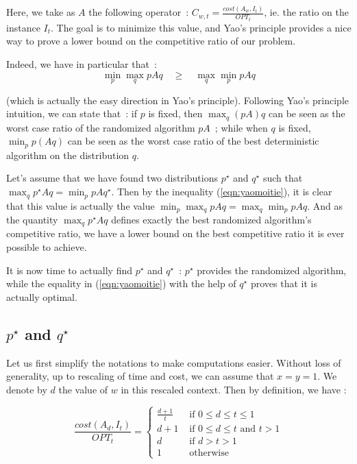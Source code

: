 \documentclass[a4paper,11pt]{article}
\begin{document}
Here, we take as $A$ the following operator~: $C_{w,t} = \frac{cost(A_w, I_t)}{OPT_t}$, ie. the ratio on the instance $I_t$. The goal is to minimize this value, and Yao's principle provides a nice way to prove a lower bound on the competitive ratio of our problem.

Indeed, we have in particular that~:
\begin{equation} \label{eqn:yaomoitie}
\min_p \max_q p A q \quad \geq \quad \max_q \min_p p A q
\end{equation}

(which is actually the easy direction in Yao's principle). Following Yao's principle intuition, we can state that~: if $p$ is fixed, then $\max_q (pA)q$ can be seen as the worst case ratio of the randomized algorithm $pA$~; while when $q$ is fixed, $\min_p p(Aq)$ can be seen as the worst case ratio of the best deterministic algorithm on the distribution $q$.

Let's assume that we have found two distributions $p^\star$ and $q^\star$ such that $\max_q p^\star A q = \min_p p A q^\star$. Then by the inequality (\ref{eqn:yaomoitie}), it is clear that this value is actually the value $\min_p \max_q p A q = \max_q \min_p p A q$. And as the quantity $\max_q p^\star A q$ defines exactly the best randomized algorithm's competitive ratio, we have a lower bound on the best competitive ratio it is ever possible to achieve.

It is now time to actually find $p^\star$ and $q^\star$~: $p^\star$ provides the randomized algorithm, while the equality in (\ref{eqn:yaomoitie}) with the help of $q^\star$ proves that it is actually optimal.


\subsection{$p^\star$ and $q^\star$}

Let us first simplify the notations to make computations easier. Without loss of generality, up to rescaling of time and cost, we can assume that $x=y=1$. We denote by $d$ the value of $w$ in this rescaled context. Then by definition, we have :

\begin{equation} \label{eq:eq1} \frac{cost(A_d,I_t)}{OPT_t} = \left\{\begin{array}{ll}
 \frac{d+1}{t}  & \text{ if }0 \leq d \leq t \leq 1 \\
 d+1 & \text{ if } 0 \leq d \leq t \text{ and } t >1 \\
 d & \text{ if } d >t>1 \\
 1 & \text{ otherwise } \end{array}\right. \end{equation}
\end{document}
